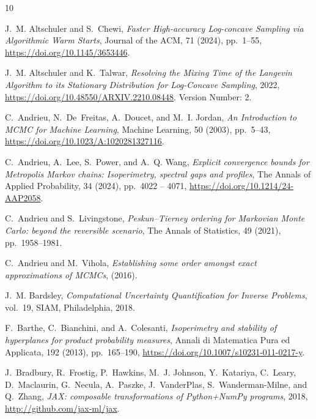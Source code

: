 \documentclass[onefignum,onetabnum]{siamonline250211}
\begin{document}
%


%
\begin{thebibliography}{10}

{\sc J.~M. Altschuler and S.~Chewi}, {\em Faster {High}-accuracy {Log}-concave
  {Sampling} via {Algorithmic} {Warm} {Starts}}, Journal of the ACM, 71 (2024),
  pp.~1--55, \url{https://doi.org/10.1145/3653446}.

{\sc J.~M. Altschuler and K.~Talwar}, {\em Resolving the {Mixing} {Time} of the
  {Langevin} {Algorithm} to its {Stationary} {Distribution} for {Log}-{Concave}
  {Sampling}}, 2022, \url{https://doi.org/10.48550/ARXIV.2210.08448}.
\newblock Version Number: 2.

{\sc C.~Andrieu, N.~De~Freitas, A.~Doucet, and M.~I. Jordan}, {\em An
  {Introduction} to {MCMC} for {Machine} {Learning}}, Machine Learning, 50
  (2003), pp.~5--43, \url{https://doi.org/10.1023/A:1020281327116}.

{\sc C.~Andrieu, A.~Lee, S.~Power, and A.~Q. Wang}, {\em Explicit convergence
  bounds for {Metropolis} {Markov} chains: {Isoperimetry}, spectral gaps and
  profiles}, The Annals of Applied Probability, 34 (2024), pp.~4022 -- 4071,
  \url{https://doi.org/10.1214/24-AAP2058}.

{\sc C.~Andrieu and S.~Livingstone}, {\em Peskun–{Tierney} ordering for
  {Markovian} {Monte} {Carlo}: beyond the reversible scenario}, The Annals of
  Statistics, 49 (2021), pp.~1958--1981.

{\sc C.~Andrieu and M.~Vihola}, {\em Establishing some order amongst exact
  approximations of {MCMCs}},  (2016).

{\sc J.~M. Bardsley}, {\em Computational Uncertainty Quantification for Inverse
  Problems}, vol.~19, SIAM, Philadelphia, 2018.

{\sc F.~Barthe, C.~Bianchini, and A.~Colesanti}, {\em Isoperimetry and
  stability of hyperplanes for product probability measures}, Annali di
  Matematica Pura ed Applicata, 192 (2013), pp.~165--190,
  \url{https://doi.org/10.1007/s10231-011-0217-y}.

{\sc J.~Bradbury, R.~Frostig, P.~Hawkins, M.~J. Johnson, Y.~Katariya, C.~Leary,
  D.~Maclaurin, G.~Necula, A.~Paszke, J.~VanderPlas, S.~Wanderman-Milne, and
  Q.~Zhang}, {\em {JAX}: composable transformations of {Python}+{NumPy}
  programs}, 2018, \url{http://github.com/jax-ml/jax}.


\end{thebibliography}
\end{document}
